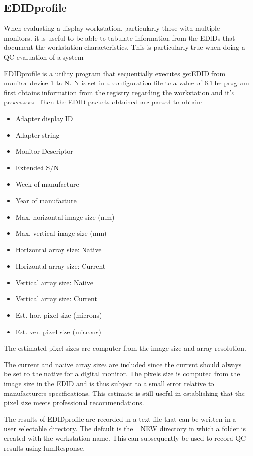 \subsection{EDIDprofile}

When evaluating a display workstation, particularly those with multiple monitors, it is useful to be able to tabulate information from the EDIDs that document the workstation characteristics. This is particularly true when doing a QC evaluation of a system. 

EDIDprofile is a utility program that sequentially executes getEDID from monitor device 1 to N. N is set in a configuration file to a value of 6.The program first obtains information from the registry regarding the workstation and it's processors. Then the EDID packets obtained are parsed to obtain:

\begin{itemize}
\item Adapter display ID
\item Adapter string
\item Monitor Descriptor
\item Extended S/N
\item Week of manufacture
\item Year of manufacture
\item Max. horizontal image size (mm)
\item Max. vertical image size (mm)
\item Horizontal array size: Native
\item Horizontal array size: Current
\item Vertical array size: Native
\item Vertical array size: Current
\item Est. hor. pixel size (microns)
\item Est. ver. pixel size (microns)
\end{itemize}

The estimated pixel sizes are computer from the image size and array resolution. 

The current and native array sizes are included since the current should always be set to the native for a digital monitor. The pixels size is computed from the image size in the EDID and is thus subject to a small error relative to manufacturers specifications. This estimate is still useful in establishing that the pixel size meets professional recommendations. 

The results of EDIDprofile are recorded in a text file that can be written in a user selectable directory. The default is the \_NEW directory in which a folder is created with the workstation name. This can subsequently be used to record QC results using lumResponse.

%